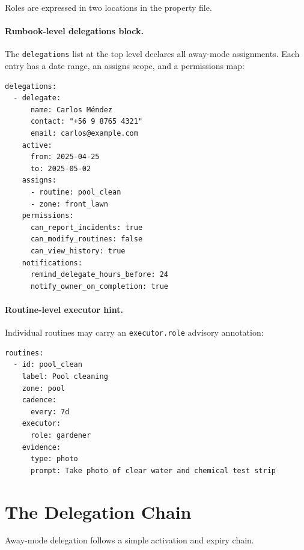 Roles are expressed in two locations in the property file.

\paragraph{Runbook-level delegations block.}
The \texttt{delegations} list at the top level declares all away-mode assignments. Each entry
has a date range, an assigns scope, and a permissions map:

\begin{verbatim}
delegations:
  - delegate:
      name: Carlos Méndez
      contact: "+56 9 8765 4321"
      email: carlos@example.com
    active:
      from: 2025-04-25
      to: 2025-05-02
    assigns:
      - routine: pool_clean
      - zone: front_lawn
    permissions:
      can_report_incidents: true
      can_modify_routines: false
      can_view_history: true
    notifications:
      remind_delegate_hours_before: 24
      notify_owner_on_completion: true
\end{verbatim}

\paragraph{Routine-level executor hint.}
Individual routines may carry an \texttt{executor.role} advisory annotation:

\begin{verbatim}
routines:
  - id: pool_clean
    label: Pool cleaning
    zone: pool
    cadence:
      every: 7d
    executor:
      role: gardener
    evidence:
      type: photo
      prompt: Take photo of clear water and chemical test strip
\end{verbatim}

\section{The Delegation Chain}
\label{sec:concepts-chain}

Away-mode delegation follows a simple activation and expiry chain.

